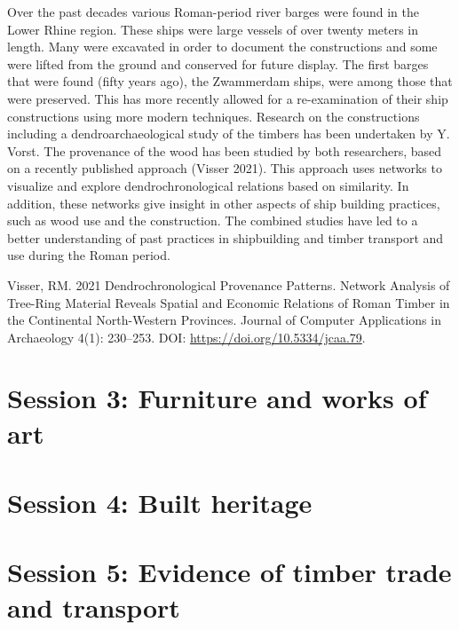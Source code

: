 \documentclass[
]{book}
\begin{document}
Over the past decades various Roman-period river barges were found in the Lower Rhine region. These ships were large vessels of over twenty meters in length. Many were excavated in order to document the constructions and some were lifted from the ground and conserved for future display. The first barges that were found (fifty years ago), the Zwammerdam ships, were among those that were preserved. This has more recently allowed for a re-examination of their ship constructions using more modern techniques. Research on the constructions including a dendroarchaeological study of the timbers has been undertaken by Y. Vorst. The provenance of the wood has been studied by both researchers, based on a recently published approach (Visser 2021). This approach uses networks to visualize and explore dendrochronological relations based on similarity. In addition, these networks give insight in other aspects of ship building practices, such as wood use and the construction. The combined studies have led to a better understanding of past practices in shipbuilding and timber transport and use during the Roman period.

Visser, RM. 2021 Dendrochronological Provenance Patterns. Network Analysis of Tree-Ring Material Reveals Spatial and Economic Relations of Roman Timber in the Continental North-Western Provinces. Journal of Computer Applications in Archaeology 4(1): 230--253. DOI: \url{https://doi.org/10.5334/jcaa.79}.

\hypertarget{session-3-furniture-and-works-of-art}{%
\chapter*{Session 3: Furniture and works of art}\label{session-3-furniture-and-works-of-art}}

\hypertarget{session-4-built-heritage}{%
\chapter*{Session 4: Built heritage}\label{session-4-built-heritage}}

\hypertarget{session-5-evidence-of-timber-trade-and-transport}{%
\chapter*{Session 5: Evidence of timber trade and transport}\label{session-5-evidence-of-timber-trade-and-transport}}
\end{document}
